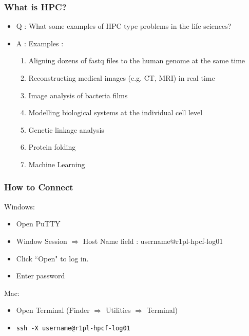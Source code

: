 \documentclass{beamer}
\newcommand{\code}[1]{\colorbox{codegray}{\texttt{#1}}}
\begin{document}
\begin{frame}
\frametitle{What is HPC?}
\begin{itemize}
    \item Q : What some examples of HPC type problems in the life sciences?
    \pause
    \item A : Examples : 
    \pause
    \begin{enumerate}
        \item Aligning dozens of fastq files to the human genome at the same time
        \pause
        \item Reconstructing medical images (e.g. CT, MRI) in real time
        \pause
        \item Image analysis of bacteria films
        \pause
        \item Modelling biological systems at the individual cell level
        \pause
        \item Genetic linkage analysis
        \pause
        \item Protein folding 
        \pause
        \item Machine Learning
    \end{enumerate}
\end{itemize}
\end{frame}



\begin{frame}
\frametitle{How to Connect}
Windows:
\begin{itemize}
    \item Open PuTTY
    \item Window Session $\Rightarrow$ Host Name field : username@r1pl-hpcf-log01
    \item Click ``Open" to log in.
    \item Enter password
\end{itemize}

\pause

Mac:
\begin{itemize}
    \item Open Terminal (Finder $\Rightarrow$ Utilities $\Rightarrow$ Terminal)
    \item \code{ssh -X username@r1pl-hpcf-log01}
\end{itemize}
\end{frame}
\end{document}
